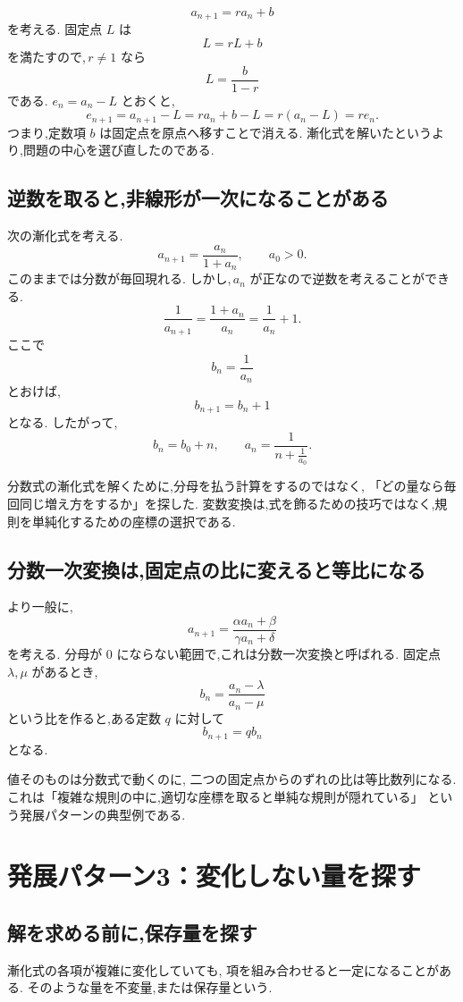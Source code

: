 \[
  a_{n+1}=ra_n+b
\]
を考える.
固定点 $L$ は
\[
  L=rL+b
\]
を満たすので,\,$r\neq1$ なら
\[
  L=\frac{b}{1-r}
\]
である.
$e_n=a_n-L$ とおくと,
\[
  e_{n+1}
  =a_{n+1}-L
  =ra_n+b-L
  =r(a_n-L)
  =re_n.
\]
つまり,定数項 $b$ は固定点を原点へ移すことで消える.
漸化式を解いたというより,問題の中心を選び直したのである.

\subsection{逆数を取ると,非線形が一次になることがある}

次の漸化式を考える.
\[
  a_{n+1}=\frac{a_n}{1+a_n},
  \qquad a_0>0.
\]
このままでは分数が毎回現れる.
しかし,\,$a_n$ が正なので逆数を考えることができる.
\[
  \frac1{a_{n+1}}
  =\frac{1+a_n}{a_n}
  =\frac1{a_n}+1.
\]
ここで
\[
  b_n=\frac1{a_n}
\]
とおけば,
\[
  b_{n+1}=b_n+1
\]
となる.
したがって,
\[
  b_n=b_0+n,\qquad
  a_n=\frac1{n+\frac1{a_0}}.
\]

分数式の漸化式を解くために,分母を払う計算をするのではなく,
「どの量なら毎回同じ増え方をするか」を探した.
変数変換は,式を飾るための技巧ではなく,規則を単純化するための座標の選択である.

\subsection{分数一次変換は,固定点の比に変えると等比になる}

より一般に,
\[
  a_{n+1}=\frac{\alpha a_n+\beta}{\gamma a_n+\delta}
\]
を考える.
分母が $0$ にならない範囲で,これは分数一次変換と呼ばれる.
固定点 $\lambda,\mu$ があるとき,
\[
  b_n=\frac{a_n-\lambda}{a_n-\mu}
\]
という比を作ると,ある定数 $q$ に対して
\[
  b_{n+1}=q b_n
\]
となる.

値そのものは分数式で動くのに,
二つの固定点からのずれの比は等比数列になる.
これは「複雑な規則の中に,適切な座標を取ると単純な規則が隠れている」
という発展パターンの典型例である.

\section{発展パターン3：変化しない量を探す}

\subsection{解を求める前に,保存量を探す}

漸化式の各項が複雑に変化していても,
項を組み合わせると一定になることがある.
そのような量を不変量,または保存量という.


